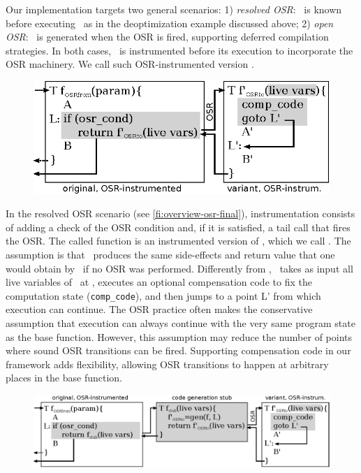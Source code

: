 Our implementation targets two general scenarios: 1) {\em resolved OSR}: \fvariant\ is known before executing \fbase\ as in the deoptimization example discussed above; 2) {\em open OSR}: \fvariant\ is generated when the OSR is fired, supporting deferred compilation strategies. In both cases, \fbase\ is instrumented before its execution to incorporate the OSR machinery. We call such OSR-instrumented version \fosrfrom.

\ifdefined\noauthorea
\begin{figure}[t]
\begin{center}
\includegraphics[width=0.7\columnwidth]{figures/overview-osr-final/overview-osr-final.eps}
\caption{\protect}
\end{center}
\end{figure}
\fi

In the resolved OSR scenario (see \ref{fi:overview-osr-final}), instrumentation consists of adding a check of the OSR condition and, if it is satisfied, a tail call that fires the OSR. The called function is an instrumented version of \fvariant, which we call \fosrto. The assumption is that \fosrto\ produces the same side-effects and return value that one would obtain by \fbase\ if no OSR was performed. Differently from \fvariant, \fosrto\ takes as input all live variables of \fbase\ at \osrpoint, executes an optional compensation code to fix the computation state ({\tt comp\_code}), and then jumps to a point \textsf{L'} from which execution can continue. The OSR practice often makes the conservative assumption that execution can always continue with the very same program state as the base function. However, this assumption may reduce the number of points where sound OSR transitions can be fired. Supporting compensation code in our framework adds flexibility, allowing OSR transitions to happen at arbitrary places in the base function.

\ifdefined\noauthorea
\begin{figure}[h!]
\begin{center}
\includegraphics[width=1.0\columnwidth]{figures/overview-osr-open/overview-osr-open.eps}
\caption{\protect}
\end{center}
\end{figure}
\fi

